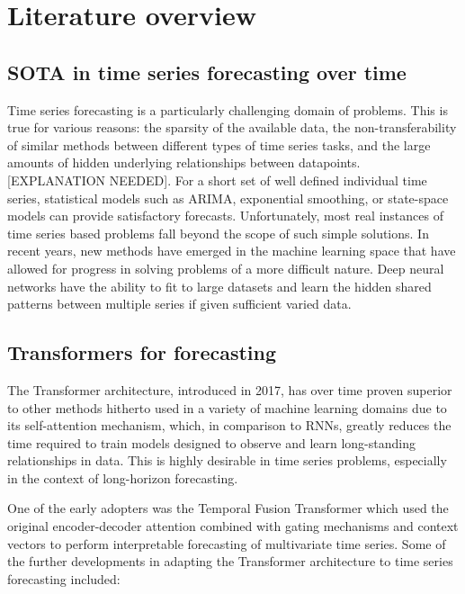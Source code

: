 \newpage
\section{Literature overview}

\subsection{SOTA in time series forecasting over time}

Time series forecasting is a particularly challenging domain of problems. This is true for various reasons: the sparsity of the available data, the non-transferability of similar methods between different types of time series tasks, and the large amounts of hidden underlying relationships between datapoints. [EXPLANATION NEEDED]. For a short set of well defined individual time series, statistical models such as ARIMA, exponential smoothing, or state-space models can provide satisfactory forecasts. Unfortunately, most real instances of time series based problems fall beyond the scope of such simple solutions. In recent years, new methods have emerged in the machine learning space that have allowed for progress in solving problems of a more difficult nature. Deep neural networks have the ability to fit to large datasets and learn the hidden shared patterns between multiple series if given sufficient varied data. 

\subsection{Transformers for forecasting}

The Transformer architecture, introduced in 2017, has over time proven superior to other methods hitherto used in a variety of machine learning domains due to its self-attention mechanism, which, in comparison to RNNs, greatly reduces the time required to train models designed to observe and learn long-standing relationships in data. This is highly desirable in time series problems, especially in the context of long-horizon forecasting. 

One of the early adopters was the Temporal Fusion Transformer  which used the original encoder-decoder attention combined with gating mechanisms and context vectors to perform interpretable forecasting of multivariate time series. Some of the further developments in adapting the Transformer architecture to time series forecasting included:

